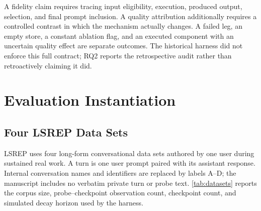 \documentclass[twoside,11pt]{article}
\begin{document}
A fidelity claim requires tracing input eligibility, execution, produced output, selection, and final prompt inclusion. A quality attribution additionally requires a controlled contrast in which the mechanism actually changes. A failed leg, an empty store, a constant ablation flag, and an executed component with an uncertain quality effect are separate outcomes. The historical harness did not enforce this full contract; RQ2 reports the retrospective audit rather than retroactively claiming it did.

\section{Evaluation Instantiation}
\subsection{Four LSREP Data Sets}
\label{sec:datasets}

LSREP uses four long-form conversational data sets authored by one user during sustained real work. A turn is one user prompt paired with its assistant response. Internal conversation names and identifiers are replaced by labels A--D; the manuscript includes no verbatim private turn or probe text. \cref{tab:datasets} reports the corpus size, probe--checkpoint observation count, checkpoint count, and simulated decay horizon used by the harness.

\begin{table}[tbp]
\centering
\small


\caption{ICE v2 LSREP data sets and evaluation coverage. Observations repeat 219 distinct probes (A: 45; B: 91; C: 37; D: 46). Token counts use the harness's documented estimate, $1.33\times$ whitespace-delimited words, rather than a model-specific tokenizer. ``Days'' is the maximum simulated decay horizon, not elapsed wall-clock time.}
\label{tab:datasets}
\end{table}
\end{document}
